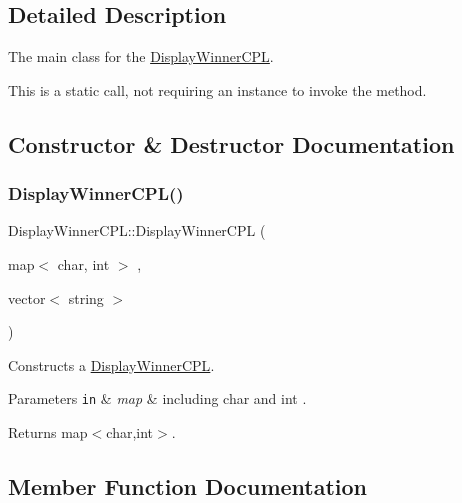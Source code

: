 \subsection{Detailed Description}
The main class for the \hyperlink{classDisplayWinnerCPL}{Display\+Winner\+C\+PL}. 

This is a static call, not requiring an instance to invoke the method. 

\subsection{Constructor \& Destructor Documentation}
\mbox{\label{classDisplayWinnerCPL_a5a3822a5efe5b15910efc9947cdaabd0}} 
\subsubsection{\texorpdfstring{Display\+Winner\+C\+P\+L()}{DisplayWinnerCPL()}}
{\footnotesize\ttfamily Display\+Winner\+C\+P\+L\+::\+Display\+Winner\+C\+PL (\begin{DoxyParamCaption}\item[{map$<$ char, int $>$}]{,  }\item[{vector$<$ string $>$}]{ }\end{DoxyParamCaption})}



Constructs a \hyperlink{classDisplayWinnerCPL}{Display\+Winner\+C\+PL}. 


\begin{DoxyParams}[1]{Parameters}
\mbox{\tt in}  & {\em map} & including char and int .\\
\hline
\end{DoxyParams}
\begin{DoxyReturn}{Returns}
map$<$char,int$>$. 
\end{DoxyReturn}


\subsection{Member Function Documentation}
\mbox{\label{classDisplayWinnerCPL_a7ec6d5d90169f136e66290f3b77045e1}} 
